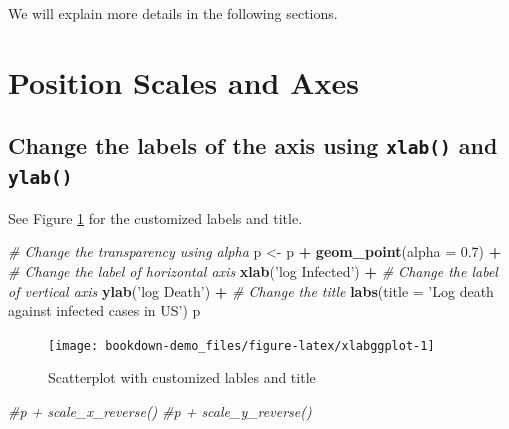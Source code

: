 \documentclass[]{book}
\newenvironment{Shaded}{\begin{snugshade}}{\end{snugshade}}
\newcommand{\KeywordTok}[1]{\textcolor[rgb]{0.13,0.29,0.53}{\textbf{#1}}}
\newcommand{\DataTypeTok}[1]{\textcolor[rgb]{0.13,0.29,0.53}{#1}}
\newcommand{\FloatTok}[1]{\textcolor[rgb]{0.00,0.00,0.81}{#1}}
\newcommand{\StringTok}[1]{\textcolor[rgb]{0.31,0.60,0.02}{#1}}
\newcommand{\CommentTok}[1]{\textcolor[rgb]{0.56,0.35,0.01}{\textit{#1}}}
\newcommand{\OperatorTok}[1]{\textcolor[rgb]{0.81,0.36,0.00}{\textbf{#1}}}
\newcommand{\NormalTok}[1]{#1}
\begin{document}
We will explain more details in the following sections.

\section{Position Scales and Axes}\label{position-scales-and-axes}

\subsection{\texorpdfstring{Change the labels of the axis using
\texttt{xlab()} and
\texttt{ylab()}}{Change the labels of the axis using xlab() and ylab()}}\label{change-the-labels-of-the-axis-using-xlab-and-ylab}

See Figure \ref{fig:xlabggplot} for the customized labels and title.

\begin{Shaded}
\begin{Highlighting}[]
\CommentTok{# Change the transparency using alpha}
\NormalTok{p <-}\StringTok{ }\NormalTok{p }\OperatorTok{+}\StringTok{ }\KeywordTok{geom_point}\NormalTok{(}\DataTypeTok{alpha =} \FloatTok{0.7}\NormalTok{) }\OperatorTok{+}\StringTok{ }
\StringTok{   }\CommentTok{# Change the label of horizontal axis}
\StringTok{  }\KeywordTok{xlab}\NormalTok{(}\StringTok{'log Infected'}\NormalTok{) }\OperatorTok{+}
\StringTok{  }\CommentTok{# Change the label of vertical axis}
\StringTok{  }\KeywordTok{ylab}\NormalTok{(}\StringTok{'log Death'}\NormalTok{) }\OperatorTok{+}\StringTok{ }
\StringTok{  }\CommentTok{# Change the title}
\StringTok{  }\KeywordTok{labs}\NormalTok{(}\DataTypeTok{title =} \StringTok{'Log death against infected cases in US'}\NormalTok{)}
\NormalTok{p}
\end{Highlighting}
\end{Shaded}

\begin{figure}

{\centering \texttt{[image: bookdown-demo\_files/figure-latex/xlabggplot-1]} 

}

\caption{Scatterplot with customized lables and title}\label{fig:xlabggplot}
\end{figure}

\begin{Shaded}
\begin{Highlighting}[]
\CommentTok{#p + scale_x_reverse()}
\CommentTok{#p + scale_y_reverse()}
\end{Highlighting}
\end{Shaded}
\end{document}

